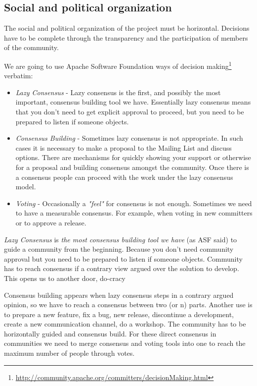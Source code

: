 \documentclass[11pt]{scrartcl}
\begin{document}

\subsection{Social and political organization}
\label{sub:social-political}

\par The social and political organization of the project must be horizontal. Decisions have to be complete through the transparency and the participation of members of the community.

\par We are going to use Apache Software Foundation ways of decision making\footnote{\url{http://community.apache.org/committers/decisionMaking.html}} verbatim:

\begin{itemize}
	\item \emph{Lazy Consensus} - Lazy consensus is the first, and possibly the most important, consensus building tool we have. Essentially lazy consensus means that you don't need to get explicit approval to proceed, but you need to be prepared to listen if someone objects.

	\item \emph{Consensus Building} - Sometimes lazy consensus is not appropriate. In such cases it is necessary to make a proposal to the Mailing List and discuss options. There are mechanisms for quickly showing your support or otherwise for a proposal and building consensus amongst the community. Once there is a consensus people can proceed with the work under the lazy consensus model.

	\item \emph{Voting} - Occasionally a \emph{"feel"} for consensus is not enough. Sometimes we need to have a measurable consensus. For example, when voting in new committers or to approve a release.
\end{itemize}

\par \emph{Lazy Consensus} is \emph{the most consensus building tool we have} (as ASF said) to guide a community from the beginning. Because you don't need community approval but you need to be prepared to listen if someone objects. Community has to reach consensus if a contrary view argued over the solution to develop. This opens us to another door, do-cracy 

\par Consensus building appears when lazy consensus steps in a contrary argued opinion, so we have to reach a consensus between two (or n) parts. Another use is to prepare a new feature, fix a bug, new release, discontinue a development, create a new communication channel, do a workshop. The community has to be horizontally guided and consensus build. For these direct consensus in communities we need to merge consensus and voting tools into one to reach the maximum number of people through votes.
\end{document}
